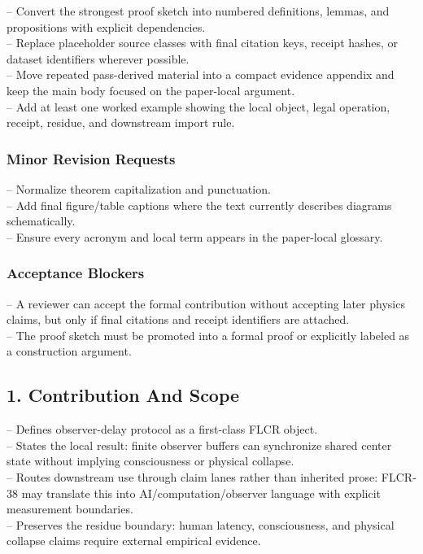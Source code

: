 \documentclass[11pt]{article}
\begin{document}
\noindent{}-- Convert the strongest proof sketch into numbered definitions, lemmas, and propositions with explicit dependencies.\\
\noindent{}-- Replace placeholder source classes with final citation keys, receipt hashes, or dataset identifiers wherever possible.\\
\noindent{}-- Move repeated pass-derived material into a compact evidence appendix and keep the main body focused on the paper-local argument.\\
\noindent{}-- Add at least one worked example showing the local object, legal operation, receipt, residue, and downstream import rule.\\

\subsubsection*{Minor Revision Requests}

\noindent{}-- Normalize theorem capitalization and punctuation.\\
\noindent{}-- Add final figure/table captions where the text currently describes diagrams schematically.\\
\noindent{}-- Ensure every acronym and local term appears in the paper-local glossary.\\

\subsubsection*{Acceptance Blockers}

\noindent{}-- A reviewer can accept the formal contribution without accepting later physics claims, but only if final citations and receipt identifiers are attached.\\
\noindent{}-- The proof sketch must be promoted into a formal proof or explicitly labeled as a construction argument.\\


\subsection*{1. Contribution And Scope}

\noindent{}-- Defines observer-delay protocol as a first-class FLCR object.\\
\noindent{}-- States the local result: finite observer buffers can synchronize shared center state without implying consciousness or physical collapse.\\
\noindent{}-- Routes downstream use through claim lanes rather than inherited prose: FLCR-38 may translate this into AI/computation/observer language with explicit measurement boundaries.\\
\noindent{}-- Preserves the residue boundary: human latency, consciousness, and physical collapse claims require external empirical evidence.\\
\end{document}
